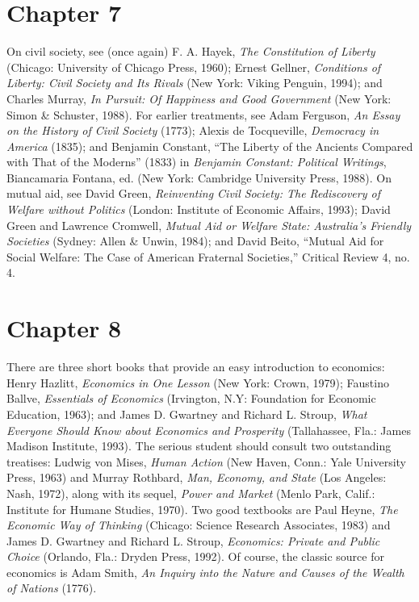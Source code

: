 \section*{Chapter 7}
On civil society, see (once again) F. A. Hayek, \textit{The Constitution of Liberty}
(Chicago: University of Chicago Press, 1960); Ernest Gellner, \textit{Conditions of
Liberty: Civil Society and Its Rivals} (New York: Viking Penguin, 1994); and
Charles Murray, \textit{In Pursuit: Of Happiness and Good Government} (New York:
Simon \& Schuster, 1988). For earlier treatments, see Adam Ferguson, \textit{An
Essay on the History of Civil Society} (1773); Alexis de Tocqueville, \textit{Democracy in
America} (1835); and Benjamin Constant, ``The Liberty of the Ancients Compared with That of the Moderns'' (1833) in \textit{Benjamin Constant: Political Writings}, Biancamaria Fontana, ed. (New York: Cambridge University Press,
1988). On mutual aid, see David Green, \textit{Reinventing Civil Society: The Rediscovery of Welfare without Politics} (London: Institute of Economic Affairs, 1993);
David Green and Lawrence Cromwell, \textit{Mutual Aid or Welfare State: Australia's
Friendly Societies} (Sydney: Allen \& Unwin, 1984); and David Beito, ``Mutual
Aid for Social Welfare: The Case of American Fraternal Societies,'' Critical
Review 4, no. 4.
\section*{Chapter 8}
There are three short books that provide an easy introduction to economics: Henry Hazlitt, \textit{Economics in One Lesson} (New York: Crown, 1979);
Faustino Ballve, \textit{Essentials of Economics} (Irvington, N.Y: Foundation for Economic Education, 1963); and James D. Gwartney and Richard L. Stroup,
\textit{What Everyone Should Know about Economics and Prosperity} (Tallahassee, Fla.:
James Madison Institute, 1993). The serious student should consult two
outstanding treatises: Ludwig von Mises, \textit{Human Action} (New Haven,
Conn.: Yale University Press, 1963) and Murray Rothbard, \textit{Man, Economy,
and State} (Los Angeles: Nash, 1972), along with its sequel, \textit{Power and Market}
(Menlo Park, Calif.: Institute for Humane Studies, 1970). Two good textbooks are Paul Heyne, \textit{The Economic Way of Thinking} (Chicago: Science Research Associates, 1983) and James D. Gwartney and Richard L. Stroup,
\textit{Economics: Private and Public Choice} (Orlando, Fla.: Dryden Press, 1992). Of
course, the classic source for economics is Adam Smith, \textit{An Inquiry into the
Nature and Causes of the Wealth of Nations} (1776).
